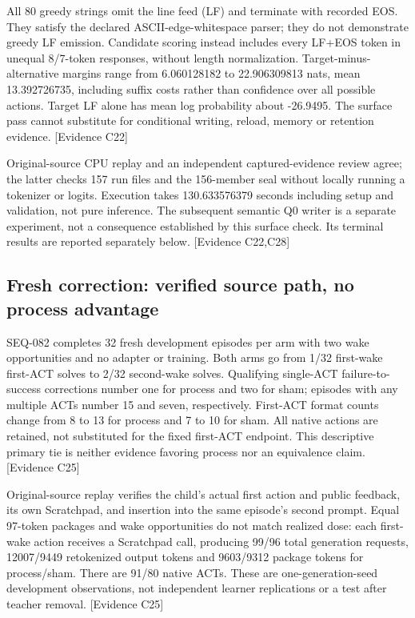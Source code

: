 \documentclass[11pt]{article}
\newcommand{\ev}[1]{\textsf{[Evidence #1]}}
\begin{document}
All 80 greedy strings omit the line feed (LF) and terminate with recorded EOS.
They satisfy the declared ASCII-edge-whitespace parser; they do not demonstrate
greedy LF emission. Candidate scoring instead includes every LF+EOS token in
unequal 8/7-token responses, without length normalization. Target-minus-alternative
margins range from 6.060128182 to 22.906309813 nats, mean 13.392726735, including
suffix costs rather than confidence over all possible actions. Target LF alone
has mean log probability about -26.9495. The surface pass cannot substitute for
conditional writing, reload, memory or retention evidence. \ev{C22}

Original-source CPU replay and an independent captured-evidence review agree;
the latter checks 157 run files and the 156-member seal without locally running
a tokenizer or logits. Execution takes 130.633576379 seconds including setup
and validation, not pure inference. The subsequent semantic Q0 writer is a
separate experiment, not a consequence established by this surface check.
Its terminal results are reported separately below. \ev{C22,C28}

\subsection{Fresh correction: verified source path, no process advantage}
SEQ-082 completes 32 fresh development episodes per arm with two wake
opportunities and no adapter or training. Both arms go from 1/32 first-wake
first-ACT solves to 2/32 second-wake solves. Qualifying single-ACT
failure-to-success corrections number one for process and two for sham;
episodes with any multiple ACTs number 15 and seven, respectively. First-ACT
format counts change from 8 to 13 for process and 7 to 10 for sham. All native
actions are retained, not substituted for the fixed first-ACT endpoint. This
descriptive primary tie is neither evidence favoring process nor an equivalence
claim. \ev{C25}

Original-source replay verifies the child's actual first action and public
feedback, its own Scratchpad, and insertion into the same episode's second
prompt. Equal 97-token packages and wake opportunities do not match realized
dose: each first-wake action receives a Scratchpad call, producing 99/96 total
generation requests, 12007/9449 retokenized output tokens and 9603/9312 package
tokens for process/sham. There are 91/80 native ACTs. These are one-generation-seed
development observations, not independent learner replications or a test after
teacher removal. \ev{C25}
\end{document}
